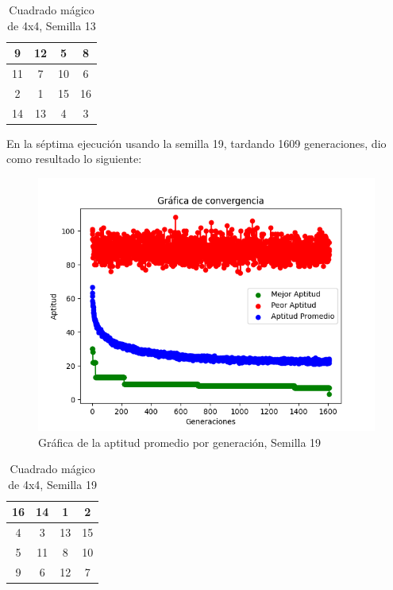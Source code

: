 \documentclass{report}
\begin{document}
    \begin{table}[H]
        \centering
        \begin{tabular}{|c|c|c|c|}
            \hline
            9 & 12 & 5 & 8\\
            \hline
            11 & 7 & 10 & 6\\
            \hline
            2 & 1 & 15 & 16\\
            \hline
            14 & 13& 4 & 3\\
            \hline
        \end{tabular}
        \caption{Cuadrado mágico de 4x4, Semilla 13}
    \end{table}
    En la séptima ejecución usando la semilla 19, tardando 1609 generaciones, dio como resultado lo siguiente:
    \begin{figure}[H]
        \centering
        \includegraphics[scale=0.5]{Grafica7_2.png}
        \caption{Gráfica de la aptitud promedio por generación, Semilla 19}
    \end{figure}
    \begin{table}[H]
        \centering
        \begin{tabular}{|c|c|c|c|}
            \hline
            16 & 14 & 1 & 2\\
            \hline
            4 & 3 & 13 & 15\\
            \hline
            5 & 11 & 8 & 10\\
            \hline
            9 & 6 & 12 & 7\\
            \hline
        \end{tabular}
        \caption{Cuadrado mágico de 4x4, Semilla 19}
    \end{table}
\end{document}
